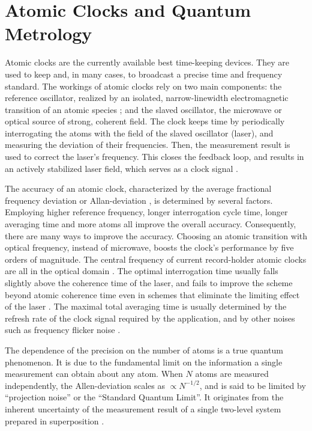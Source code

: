 \section{Atomic Clocks and Quantum Metrology}
Atomic clocks are the currently available best time-keeping devices. They are
used to keep and, in many cases, to broadcast a precise time and frequency
standard. The workings of atomic clocks rely on two main components: the
reference oscillator, realized by an isolated, narrow-linewidth electromagnetic
transition of an atomic species \cite{Derevianko2011}; and the slaved
oscillator, the microwave or optical source of strong, coherent field. The
clock keeps time by periodically interrogating the atoms with the field of the
slaved oscillator (laser), and measuring the deviation of their frequencies.
Then, the measurement result is  used to correct the laser's frequency. This
closes the feedback loop, and results in an actively stabilized laser field, which serves
as a clock signal \cite{Diddams2004}.

The accuracy of an atomic clock, characterized by the average fractional
frequency deviation or Allan-deviation 
\cite{Allan1966, Rutman1978}, is determined by several factors. Employing
higher reference frequency, longer interrogation cycle time, longer averaging
time and more atoms all improve the overall accuracy. Consequently, there are
many ways to improve the accuracy. Choosing an atomic transition with optical
frequency, instead of microwave, boosts the clock's performance by five orders
of magnitude. The central frequency of current record-holder atomic clocks are all
in the optical domain \cite{Ludlow2015}. The optimal interrogation time usually
falls slightly above the coherence time of the laser, and fails to improve the scheme
beyond atomic coherence time even in schemes that eliminate the limiting effect
of the laser \cite{Borregaard2013, Rosenband2013}. The maximal
total averaging time is usually determined by the refresh rate of the clock
signal required by the application, and by other noises such as frequency
flicker noise \cite{Barnes1966}.

The dependence of the precision on the number of atoms is a true quantum
phenomenon.
It is due to the fundamental limit on the information a single measurement can
obtain about any atom. When $N$ atoms are measured independently, the
Allen-deviation scales as $\propto N^{-1/2}$, and is said to be limited by
``projection noise'' or the ``Standard Quantum Limit''. It originates from the
inherent uncertainty of the measurement result of a single two-level system
prepared in superposition \cite{Santarelli1998}.

